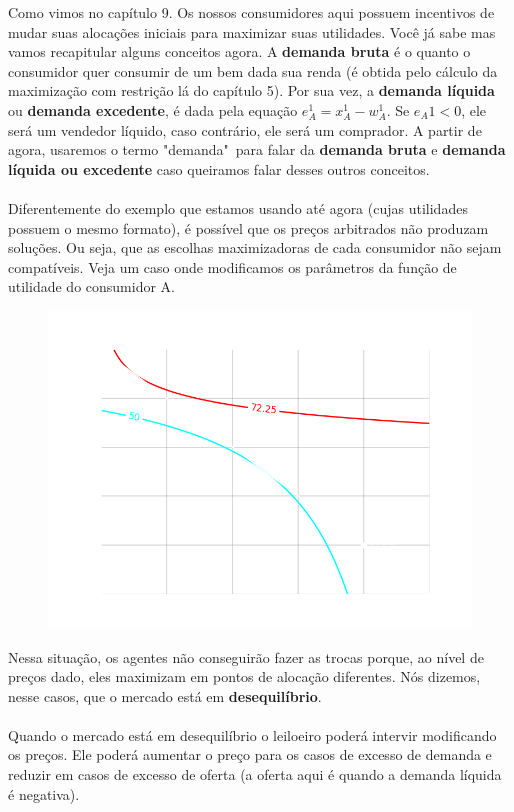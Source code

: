 \documentclass[a4paper,11pt,oneside]{book}
\theoremstyle{definition}
\theoremstyle{break}
\begin{document}
Como vimos no capítulo 9. Os nossos consumidores aqui possuem incentivos de mudar suas alocações iniciais para maximizar suas utilidades. Você já sabe mas vamos recapitular alguns conceitos agora. A \textbf{demanda bruta} é o quanto o consumidor quer consumir de um bem dada sua renda (é obtida pelo cálculo da maximização com restrição lá do capítulo 5). Por sua vez, a \textbf{demanda líquida} ou \textbf{demanda excedente}, é dada pela equação $e_A^1 = x_A^1 - w_A^1$. Se $e_A1 < 0$, ele será um vendedor líquido, caso contrário, ele será um comprador. A partir de agora, usaremos o termo "demanda"\ para falar da \textbf{demanda bruta} e \textbf{demanda líquida ou excedente} caso queiramos falar desses outros conceitos.
\\~\\
Diferentemente do exemplo que estamos usando até agora (cujas utilidades possuem o mesmo formato), é possível que os preços arbitrados não produzam soluções. Ou seja, que as escolhas maximizadoras de cada consumidor não sejam compatíveis. Veja um caso onde modificamos os parâmetros da função de utilidade do consumidor A.

\begin{figure}[H]
\centering
\includegraphics[scale=0.6]{cap32_4-caixa_edgeworth_3.png}
\end{figure}


Nessa situação, os agentes não conseguirão fazer as trocas porque, ao nível de preços dado, eles maximizam em pontos de alocação diferentes. Nós dizemos, nesse casos, que o mercado está em \textbf{desequilíbrio}.
\\~\\
Quando o mercado está em desequilíbrio o leiloeiro poderá intervir modificando os preços. Ele poderá aumentar o preço para os casos de excesso de demanda e reduzir em casos de excesso de oferta (a oferta aqui é quando a demanda líquida é negativa). 
\end{document}
